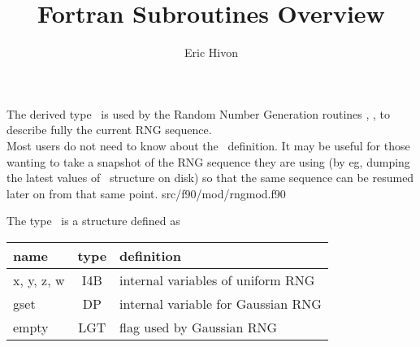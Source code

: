 
\sloppy


\title{\healpix Fortran Subroutines Overview}
 \section[planck\_rng derived type]{ }
\label{sub:planck_rng}
\author{Eric Hivon}

\begin{facility}
{The derived type \thedocid\ is used by the Random Number Generation routines 
,
, 
 to describe fully the current RNG
sequence.\\
Most users do not need to know about the \thedocid\ definition. It may be
useful for those wanting to take a snapshot of the RNG sequence they are using (by eg,
dumping the latest values of \thedocid\ structure on disk) so that the same sequence can be resumed
later on from that same point.}
{src/f90/mod/rngmod.f90}
\end{facility}



The type \thedocid\ is a structure defined as

\begin{mytable}{%
\begin{tabularx}{\linewidth}{lc X}
name & type  & definition \\
\hline
x, y, z, w & I4B & internal variables of uniform RNG\\
gset & DP & internal variable for Gaussian RNG\\
empty & LGT & flag used by Gaussian RNG\\
\hline
\end{tabularx}
}%
\end{mytable}




